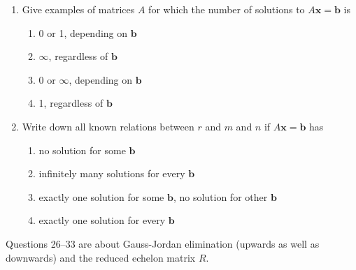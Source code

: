 \documentclass[14pt, a4paper]{article}
\begin{document}
\begin{enumerate}[resume]
    \item Give examples of matrices $A$ for which the number of solutions to $A\mathbf{x} = \mathbf{b}$ is
          \begin{enumerate}
              \item 0 or 1, depending on $\mathbf{b}$
              \item $\infty$, regardless of $\mathbf{b}$
              \item 0 or $\infty$, depending on $\mathbf{b}$
              \item 1, regardless of $\mathbf{b}$
          \end{enumerate}

    \item Write down all known relations between $r$ and $m$ and $n$ if $A\mathbf{x} = \mathbf{b}$ has
          \begin{enumerate}
              \item no solution for some $\mathbf{b}$
              \item infinitely many solutions for every $\mathbf{b}$
              \item exactly one solution for some $\mathbf{b}$, no solution for other $\mathbf{b}$
              \item exactly one solution for every $\mathbf{b}$
          \end{enumerate}


\end{enumerate}

\noindent Questions 26--33 are about Gauss-Jordan elimination (upwards as well as downwards) and the reduced echelon matrix $R$.
\end{document}
